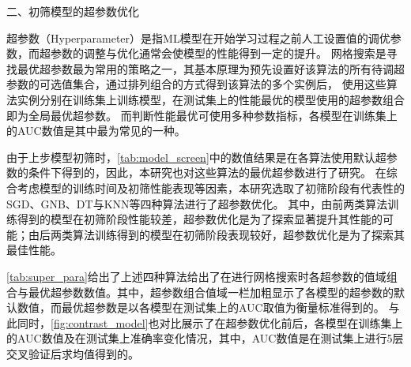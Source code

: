 二、初筛模型的超参数优化

超参数（Hyperparameter）是指ML模型在开始学习过程之前人工设置值的调优参数\cite{scikit-learn,Aurélien2018}，而超参数的调整与优化通常会使模型的性能得到一定的提升。
网格搜索是寻找最优超参数最为常用的策略之一，其基本原理为预先设置好该算法的所有待调超参数的可选值集合，通过排列组合的方式得到该算法的多个实例后，
使用这些算法实例分别在训练集上训练模型，在测试集上的性能最优的模型使用的超参数组合即为全局最优超参数\cite{Aurélien2018}。
而判断性能最优可使用多种参数指标，各模型在训练集上的AUC数值是其中最为常见的一种。

由于上步模型初筛时，\autoref{tab:model_screen}中的数值结果是在各算法使用默认超参数的条件下得到的，因此，本研究也对这些算法的最优超参数进行了研究。
在综合考虑模型的训练时间及初筛性能表现等因素，本研究选取了初筛阶段有代表性的SGD、GNB、DT与KNN等四种算法进行了超参数优化。
其中，由前两类算法训练得到的模型在初筛阶段性能较差，超参数优化是为了探索显著提升其性能的可能；由后两类算法训练得到的模型在初筛阶段表现较好，超参数优化是为了探索其最佳性能。

\autoref{tab:super_para}给出了上述四种算法给出了在进行网格搜索时各超参数的值域组合与最优超参数数值。其中，超参数组合值域一栏加粗显示了各模型的超参数的默认数值，而最优超参数是以各模型在测试集上的AUC取值为衡量标准得到的。
与此同时，\autoref{fig:contrast_model}也对比展示了在超参数优化前后，各模型在训练集上的AUC数值及在测试集上准确率变化情况，其中，AUC数值是在测试集上进行5层交叉验证后求均值得到的。

